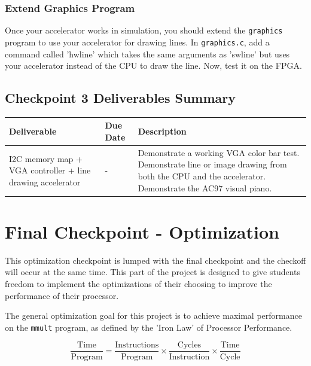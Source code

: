 \documentclass[11pt]{article}
\begin{document}
\subsubsection{Extend Graphics Program}
Once your accelerator works in simulation, you should extend the \verb|graphics| program to use your accelerator for drawing lines. In \verb|graphics.c|, add a command called 'hwline' which takes the same arguments as 'swline' but uses your accelerator instead of the CPU to draw the line. Now, test it on the FPGA.

\subsection{Checkpoint 3 Deliverables Summary}

\begin{center}
	\begin{tabular}{m{30mm} m{35mm} m{70mm}}
		\toprule
		\textbf{Deliverable} & \textbf{Due Date} & \textbf{Description} \\
		\midrule
		I2C memory map + VGA controller + line drawing accelerator & \ethernetDueDate \space - \dueDateTime & Demonstrate a working VGA color bar test. Demonstrate line or image drawing from both the CPU and the accelerator. Demonstrate the AC97 visual piano. \\
		\bottomrule
	\end{tabular}
\end{center}

\pagebreak

\section{Final Checkpoint - Optimization}
This optimization checkpoint is lumped with the final checkpoint and the checkoff will occur at the same time. This part of the project is designed to give students freedom to implement the optimizations of their choosing to improve the performance of their processor.

The general optimization goal for this project is to achieve maximal performance on the \verb|mmult| program, as defined by the 'Iron Law' of Processor Performance.

\begin{equation*}
\frac{\text{Time}}{\text{Program}} = \frac{\text{Instructions}}{\text{Program}} \times \frac{\text{Cycles}}{\text{Instruction}} \times \frac{\text{Time}}{\text{Cycle}}
\end{equation*}
\end{document}
